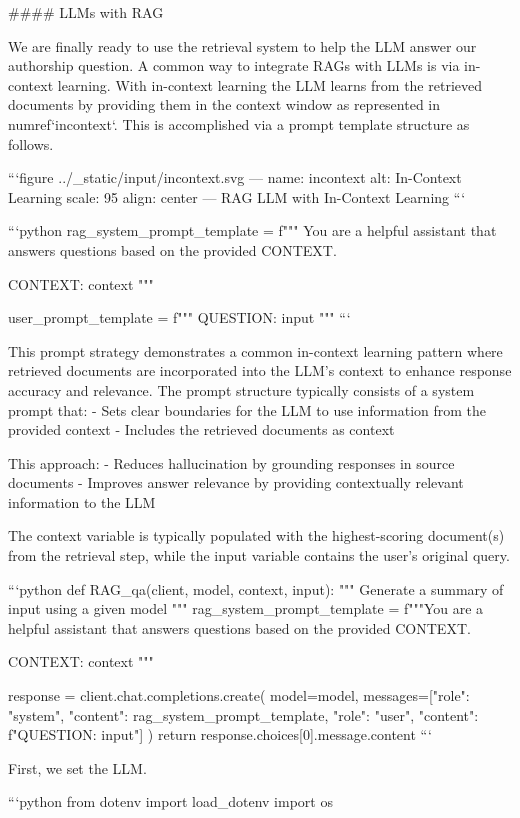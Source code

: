 {{#### LLMs with RAG

We are finally ready to use the retrieval system to help the LLM answer our authorship question. A common way to integrate RAGs with LLMs is via in-context learning. With in-context learning the LLM learns from the retrieved documents by providing them in the context window as represented in {numref}`incontext`. This is accomplished via a prompt template structure as follows.

```{figure} ../_static/input/incontext.svg
---
name: incontext
alt: In-Context Learning
scale: 95%
align: center
---
RAG LLM with In-Context Learning
```


```python
 rag_system_prompt_template = f"""
 You are a helpful assistant that answers questions based on the provided CONTEXT.

 CONTEXT: {context}
 """

 user_prompt_template = f"""
 QUESTION: {input}
 """
```

This prompt strategy demonstrates a common in-context learning pattern where retrieved documents are incorporated into the LLM's context to enhance response accuracy and relevance. The prompt structure typically consists of a system prompt that:
- Sets clear boundaries for the LLM to use information from the provided context
- Includes the retrieved documents as context

This approach:
- Reduces hallucination by grounding responses in source documents
- Improves answer relevance by providing contextually relevant information to the LLM

The context variable is typically populated with the highest-scoring document(s) from the retrieval step, while the input variable contains the user's original query.


```python
def RAG_qa(client, model, context, input):
    """
    Generate a summary of input using a given model
    """
    rag_system_prompt_template =  f"""You are a helpful assistant that answers questions based on the provided CONTEXT.

    CONTEXT: {context}
    """
    
    response = client.chat.completions.create(
    model=model,
        messages=[{"role": "system", "content": rag_system_prompt_template},
                 {"role": "user", "content": f"QUESTION: {input}"}]
    )
    return response.choices[0].message.content
```

First, we set the LLM.


```python
from dotenv import load_dotenv
import os

}}
